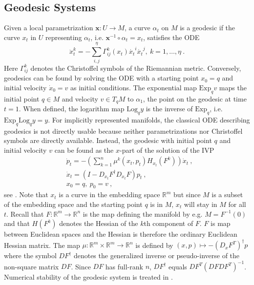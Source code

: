 \documentclass[final]{svjour3}
\newcommand{\RR}{\mathbb{R}}
\newcommand{\Exp}{\mathrm{Exp}}
\newcommand{\Log}{\mathrm{Log}}
\newcommand{\Hess}{H}
\newcommand{\param}[1]{\mathbf{#1}}
\begin{document}
\subsection{Geodesic Systems}
\label{sec:geodesic-systems}
Given a local parametrization $\param{x}:U\rightarrow M$, a curve $\alpha_t$ on
$M$ is a geodesic if the curve $x_t$ in $U$ representing $\alpha_t$, i.e.
$\param{x}^{-1}\circ\alpha_t=x_t$, satisfies the ODE
\begin{equation}
        \ddot{x}_t^k=-\sum_{i,j}^\eta\Gamma_{ij}^k(x_t)\dot{x_t}^i\dot{x_t}^j,\
        k=1,\ldots,\eta \ .
    \label{eq:param-geo}
\end{equation}
Here $\Gamma_{ij}^k$ denotes the Christoffel symbols of the Riemannian metric.
Conversely, geodesics can be found by solving the ODE with a starting point
$x_0=q$ and initial velocity $\dot{x}_0=v$ as initial conditions. 
The exponential map $\Exp_q v$ maps the initial point $q\in M$ and velocity
$v\in T_q M$ to 
$\alpha_1$, the
point on the geodesic at time $t=1$.
When defined, the logarithm map $\Log_q y$ is the inverse of
$\Exp_q$, i.e. $\Exp_q\Log_q y=y$.
For implicitly represented manifolds, the classical ODE describing geodesics is 
not directly usable because neither parametrizations nor Christoffel symbols 
are directly available. Instead, the geodesic with initial point $q$ and
initial velocity $v$ can be found as the $x$-part of the solution 
of the IVP
\begin{equation}
    \begin{split}
        &\dot{p}_t=-\left(\sum_{k=1}^n\mu^k(x_t,p_t)\Hess_{x_t}(F^k)\right)\dot{x}_t\ ,\\
        &\dot{x}_t=\left(I-D_{x_t}F^\dagger D_{x_t}F\right)p_t\ ,\\
        &x_0=q,\ p_0=v \ ,
    \end{split}
    \label{sys:impl-geo}
\end{equation}
see \cite{dedieu_symplectic_2005}. Note that $x_t$ is a curve in the embedding
space $\RR^m$ but since $M$ is a subset of the embedding space and the starting
point $q$ is in $M$, $x_t$ will stay in $M$ for all $t$.
Recall that $F:\RR^m\rightarrow\RR^n$ is the map defining the manifold by
e.g. $M=F^{-1}(0)$ and that $\Hess(F^k)$ denotes the Hessian of the $k$th
component of $F$. $F$ is map between Euclidean spaces and the Hessian is
therefore the ordinary Euclidean Hessian matrix. 
The map $\mu:\RR^m\times\RR^m\rightarrow\RR^n$ is defined by
$(x,p)\mapsto-(D_{x}F^T)^\dagger p$ where
the symbol $DF^\dagger$ denotes the generalized inverse or pseudo-inverse
of the non-square matrix $DF$. Since $DF$ has full-rank $n$, $DF^\dagger$ equals
$DF^T(DFDF^T)^{-1}$. Numerical stability of the geodesic
system is treated in \cite{dedieu_symplectic_2005}.
\end{document}
